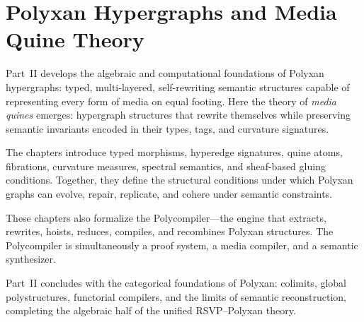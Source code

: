 \part{Polyxan Hypergraphs and Media Quine Theory}

Part~II develops the algebraic and computational foundations of Polyxan
hypergraphs: typed, multi-layered, self-rewriting semantic structures
capable of representing every form of media on equal footing. Here the
theory of \emph{media quines} emerges: hypergraph structures that rewrite
themselves while preserving semantic invariants encoded in their types,
tags, and curvature signatures.

The chapters introduce typed morphisms, hyperedge signatures, quine
atoms, fibrations, curvature measures, spectral semantics, and sheaf-based
gluing conditions. Together, they define the structural conditions under
which Polyxan graphs can evolve, repair, replicate, and cohere under
semantic constraints.

These chapters also formalize the Polycompiler---the engine that extracts,
rewrites, hoists, reduces, compiles, and recombines Polyxan structures.
The Polycompiler is simultaneously a proof system, a media compiler, and
a semantic synthesizer.

Part~II concludes with the categorical foundations of Polyxan:
colimits, global polystructures, functorial compilers, and the limits of
semantic reconstruction, completing the algebraic half of the unified
RSVP--Polyxan theory.

\cleardoublepage

